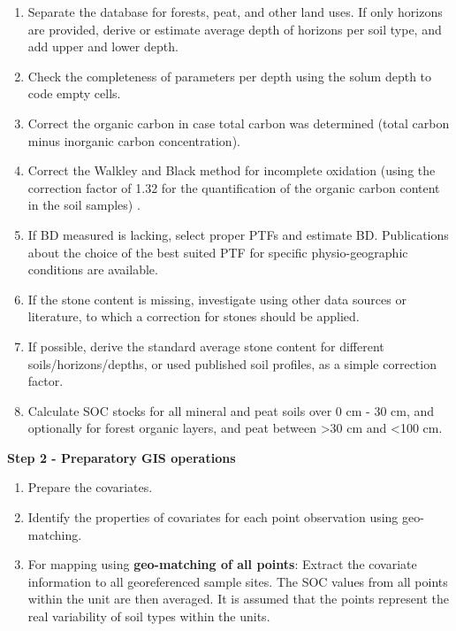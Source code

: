 \documentclass[10pt,b5paper,]{book}
\providecommand{\tightlist}{%
  \setlength{\itemsep}{0pt}\setlength{\parskip}{0pt}}
\theoremstyle{definition}
\theoremstyle{definition}
\theoremstyle{definition}
\theoremstyle{remark}
\begin{document}
\begin{enumerate}
\def\labelenumi{\arabic{enumi}.}
\tightlist
\item
  Separate the database for forests, peat, and other land uses. If only
  horizons are provided, derive or estimate average depth of horizons
  per soil type, and add upper and lower depth.
\item
  Check the completeness of parameters per depth using the solum depth
  to code empty cells.
\item
  Correct the organic carbon in case total carbon was determined (total
  carbon minus inorganic carbon concentration).
\item
  Correct the Walkley and Black method for incomplete oxidation (using
  the correction factor of 1.32 for the quantification of the organic
  carbon content in the soil samples) \citep{walkley1934examination}.
\item
  If BD measured is lacking, select proper PTFs and estimate BD.
  Publications about the choice of the best suited PTF for specific
  physio-geographic conditions are available.
\item
  If the stone content is missing, investigate using other data sources
  or literature, to which a correction for stones should be applied.
\item
  If possible, derive the standard average stone content for different
  soils/horizons/depths, or used published soil profiles, as a simple
  correction factor.
\item
  Calculate SOC stocks for all mineral and peat soils over 0 cm - 30 cm,
  and optionally for forest organic layers, and peat between
  \textgreater{}30 cm and \textless{}100 cm.
\end{enumerate}

\textbf{Step 2 - Preparatory GIS operations}

\begin{enumerate}
\def\labelenumi{\arabic{enumi}.}
\tightlist
\item
  Prepare the covariates.
\item
  Identify the properties of covariates for each point observation using
  geo-matching.
\item
  For mapping using \textbf{geo-matching of all points}: Extract the
  covariate information to all georeferenced sample sites. The SOC
  values from all points within the unit are then averaged. It is
  assumed that the points represent the real variability of soil types
  within the units.
\end{enumerate}
\end{document}
